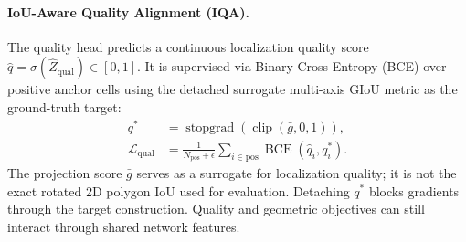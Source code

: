 \paragraph{IoU-Aware Quality Alignment (IQA).}
The quality head predicts a continuous localization quality score $\hat{q} = \sigma(\hat{Z}_{\mathrm{qual}}) \in [0, 1]$. It is supervised via Binary Cross-Entropy (BCE) over positive anchor cells using the detached surrogate multi-axis GIoU metric as the ground-truth target:
\begin{equation}
    \begin{aligned}
        q^* &= \operatorname{stopgrad}(\operatorname{clip}(\bar{g}, 0, 1)), \\
        \mathcal{L}_{\mathrm{qual}} &= \frac{1}{N_{\mathrm{pos}} + \epsilon} \sum_{i \in \mathrm{pos}} \operatorname{BCE}(\hat{q}_i, q_i^*).
    \end{aligned}
    \label{eq:iqa_loss}
\end{equation}
The projection score $\bar{g}$ serves as a surrogate for localization quality; it is not the exact rotated 2D polygon IoU used for evaluation. Detaching $q^*$ blocks gradients through the target construction. Quality and geometric objectives can still interact through shared network features.

